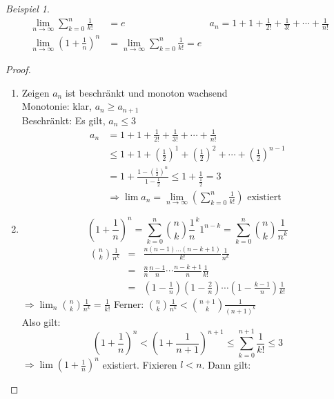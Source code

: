 \documentclass[ngerman,titlepage,twoside, parskip=half*]{scrreprt}
\theoremstyle{plain}
\theoremstyle{definition}
\theoremstyle{remark}
\newtheorem*{beispiel}{Beispiel}
\begin{document}
\begin{beispiel}
\begin{align*}
  \lim_{n \rightarrow \infty} \sum_{k=0}^n \frac{1}{k!} &= e & a_n=
  1+1+\frac{1}{2!}+\frac{1}{3!}+\cdots + \frac{1}{n!}\\
  \lim_{n \rightarrow \infty} \left(1+\frac{1}{n}\right)^n &= \lim_{n \rightarrow
    \infty} \sum_{k=0}^n \frac{1}{k!}=e
\end{align*}
\end{beispiel}
\begin{proof}
\begin{enumerate}
  \item Zeigen $a_n$ ist beschränkt und monoton wachsend\\
    Monotonie: klar, $a_n \geq a_{n+1}$\\
    Beschränkt: Es gilt, $a_n \leq 3$
    \begin{align*}
      a_n& = 1+1+\frac{1}{2!}+\frac{1}{3!}+\cdots + \frac{1}{n!}\\
      & \leq 1+ 1+ \left(\frac{1}{2}\right)^1
      +\left(\frac{1}{2}\right)^2 +\cdots + \left( \frac{1}{2} \right)^{n-1}\\
      & = 1+ \frac{1-\left(\frac{1}{2}\right)^n}{1-\frac{1}{2}} \leq
      1+\frac{1}{\frac{1}{2}} = 3\\
      &\Rightarrow \lim a_n = \lim_{n \rightarrow \infty}
      \left(\sum_{k=0}^n \frac{1}{k!}\right) \text{ existiert}
  \end{align*}
  \item \[\left(1+\frac{1}{n}\right)^n = \sum_{k=0}^n \binom{n}{k}\frac{1}{n}^k
    1^{n-k} = \sum_{k=0}^n \binom{n}{k} \frac{1}{n^k}\]
    \begin{align*}
    \binom{n}{k} \frac{1}{n^k} & = & \frac{n(n-1)\ldots(n-k+1)}{k!}\frac{1}{n^k}\\
    & = & \frac{n}{n} \frac{n-1}{n} \cdots \frac{n-k+1}{n} \frac{1}{k!}\\
    & = & \left(1-\frac{1}{n}\right)\left(1-\frac{2}{n}\right) \cdots \left(1-
    \frac{k-1}{n}\right) \frac{1}{k!}
    \end{align*}
    $\Rightarrow \lim_n \binom{n}{k} \frac{1}{n^k}=\frac{1}{k!}$ Ferner:
    $\binom{n}{k} \frac{1}{n^k} < \binom{n+1}{k} \frac{1}{(n+1)^k}$\\
    Also gilt: \[\left(1+\frac{1}{n}\right)^n<\left(1+\frac{1}{n+1}\right)^{n+1}
    \leq \sum_{k=0}^{n+1} \frac{1}{k!} \leq 3\]
    $\Rightarrow \lim \left(1+\frac{1}{n}\right)^n$ existiert. Fixieren $l<n$.
    Dann gilt:\\

\end{enumerate}
\end{proof}
\end{document}
